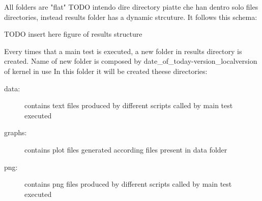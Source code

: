 \documentclass[a4paper,10pt]{article}
\begin{document}
\begin{multicols}{2}
All folders are "flat" TODO intendo dire directory piatte che han dentro solo files
directories, instead results folder has a dynamic strcuture. It follows this schema:

TODO insert here figure of results structure

Every times that a main test is executed, a new folder in results directory is created.
Name of new folder is composed by date\_of\_today-version\_localversion of kernel in use
In this folder it will be created theese directories:

\begin{description}
	\item[data:] contains text files produced by different scripts called by main test executed
	\item[graphs:] contains plot files generated according files present in data folder
	\item[png:] contains png files produced by different scripts called by main test executed
\end{description}






\end{multicols}
\end{document}

